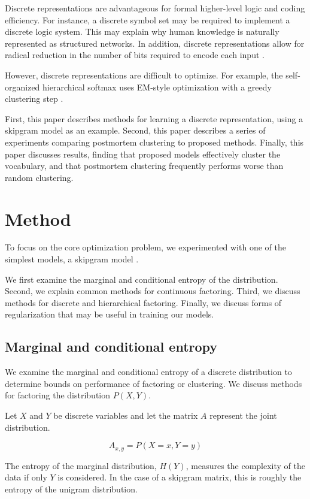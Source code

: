 \documentclass[11pt,letterpaper]{article}
\begin{document}
Discrete representations are advantageous for formal higher-level logic and coding efficiency. For instance, a discrete symbol set may be required to implement a discrete logic system. This may explain why human knowledge is naturally represented as structured networks. In addition, discrete representations allow for radical reduction in the number of bits required to encode each input \cite{Hu17}.

However, discrete representations are difficult to optimize. For example, the self-organized hierarchical softmax uses EM-style optimization with a greedy clustering step \cite{2017arXiv170708588S}.

First, this paper describes methods for learning a discrete representation, using a skipgram model as an example. Second, this paper describes a series of experiments comparing postmortem clustering to proposed methods. Finally, this paper discusses results, finding that proposed models effectively cluster the vocabulary, and that postmortem clustering frequently performs worse than random clustering.

\section{Method}

To focus on the core optimization problem, we experimented with one of the simplest models, a skipgram model \cite{Mikolov1301} \cite{MikolovSCCD13}.

We first examine the marginal and conditional entropy of the distribution. Second, we explain common methods for continuous factoring. Third, we discuss methods for discrete and hierarchical factoring. Finally, we discuss forms of regularization that may be useful in training our models.

\subsection{Marginal and conditional entropy}

We examine the marginal and conditional entropy of a discrete distribution to determine bounds on performance of factoring or clustering. We discuss methods for factoring the distribution $P(X,Y)$.

Let $X$ and $Y$ be discrete variables and let the matrix $A$ represent the joint distribution.

$$A_{x,y}=P(X=x, Y=y)$$

The entropy of the marginal distribution, $H(Y)$, measures the complexity of the data if only $Y$ is considered. In the case of a skipgram matrix, this is roughly the entropy of the unigram distribution.
\end{document}
